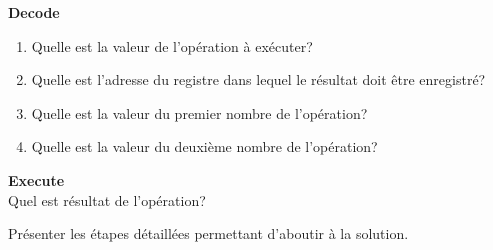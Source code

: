 \begin{Exercice}[5 minutes] \textbf{Decode}
    \begin{enumerate}
        \item Quelle est la valeur de l'opération à exécuter?
        \item Quelle est l'adresse du registre dans lequel le résultat doit être enregistré?
        \item Quelle est la valeur du premier nombre de l'opération?
        \item Quelle est la valeur du deuxième nombre de l'opération?
    \end{enumerate}
\end{Exercice}

\begin{Exercice}[5 minutes] \textbf{Execute}\\
    Quel est résultat de l'opération?
\end{Exercice}

\begin{conseil}
    
\end{conseil}
\begin{solution}
    Présenter les étapes détaillées permettant d'aboutir à la solution.
\end{solution}


